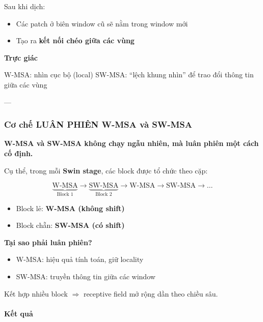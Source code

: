 Sau khi dịch:
\begin{itemize}
	\item Các patch ở biên window cũ sẽ nằm trong window mới
	\item Tạo ra \textbf{kết nối chéo giữa các vùng}
\end{itemize}

\begin{mdframed}[style=infobox]
	\textbf{Trực giác}
	
	W-MSA: nhìn cục bộ (local)  
	SW-MSA: “lệch khung nhìn” để trao đổi thông tin giữa các vùng
\end{mdframed}

---

\subsubsection{Cơ chế LUÂN PHIÊN W-MSA và SW-MSA}
\label{subsubsec:swin_alternation}

\begin{center}
	\textbf{W-MSA và SW-MSA không chạy ngẫu nhiên, mà luân phiên một cách cố định.}
\end{center}

Cụ thể, trong mỗi \textbf{Swin stage}, các block được tổ chức theo cặp:

\[
\underbrace{\text{W-MSA}}_{\text{Block 1}} \rightarrow 
\underbrace{\text{SW-MSA}}_{\text{Block 2}} \rightarrow 
\text{W-MSA} \rightarrow 
\text{SW-MSA} \rightarrow \dots
\]

\begin{itemize}
	\item Block lẻ: \textbf{W-MSA (không shift)}
	\item Block chẵn: \textbf{SW-MSA (có shift)}
\end{itemize}

\begin{mdframed}[style=infobox]
	\textbf{Tại sao phải luân phiên?}
	
	\begin{itemize}
		\item W-MSA: hiệu quả tính toán, giữ locality
		\item SW-MSA: truyền thông tin giữa các window
	\end{itemize}
	
	Kết hợp nhiều block $\Rightarrow$ receptive field mở rộng dần theo chiều sâu.
\end{mdframed}

\paragraph{Kết quả}

